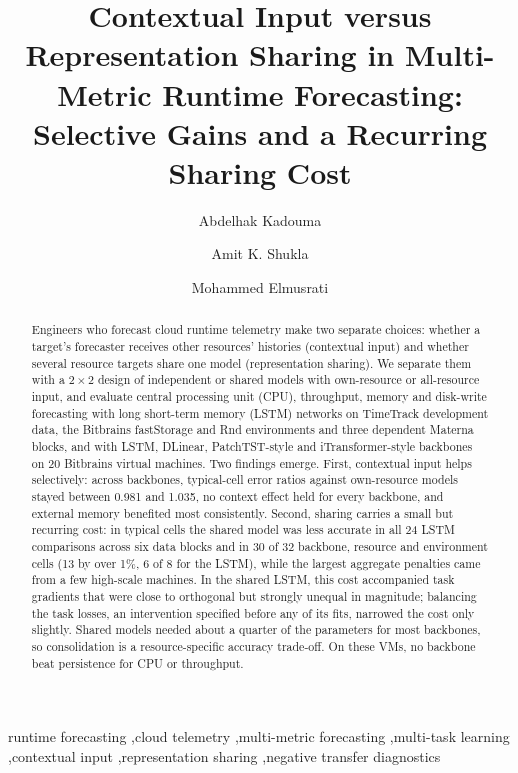 \documentclass[5p,twocolumn]{elsarticle}
\begin{document}
\begin{frontmatter}

\title{Contextual Input versus Representation Sharing in Multi-Metric Runtime Forecasting: Selective Gains and a Recurring Sharing Cost}

\author[uva]{Abdelhak Kadouma}
\author[uva,sau]{Amit K. Shukla}
\author[uva]{Mohammed Elmusrati}



\begin{abstract}
Engineers who forecast cloud runtime telemetry make two separate choices:
whether a target's forecaster receives other resources' histories (contextual
input) and whether several resource targets share one model (representation
sharing). We separate them with a $2\times2$ design of independent or shared
models with own-resource or all-resource input, and evaluate central
processing unit (CPU), throughput, memory and disk-write forecasting with long
short-term memory (LSTM) networks on TimeTrack development data, the
Bitbrains fastStorage and Rnd environments and three dependent Materna
blocks, and with LSTM, DLinear, PatchTST-style and iTransformer-style
backbones on 20 Bitbrains virtual machines. Two findings emerge. First,
contextual input helps selectively: across backbones, typical-cell error
ratios against own-resource models stayed between 0.981 and 1.035, no context
effect held for every backbone, and external memory benefited most
consistently. Second, sharing carries a small but recurring cost: in typical
cells the shared model was less accurate in all 24 LSTM comparisons across six data blocks
and in 30 of 32 backbone, resource and environment cells (13 by over 1\%,
6 of 8 for the LSTM), while the largest aggregate penalties came from a
few high-scale machines. In the shared LSTM,
this cost accompanied task gradients that were close to orthogonal but
strongly unequal in magnitude; balancing the task losses, an intervention
specified before any of its fits, narrowed the cost only slightly.
Shared models needed about a quarter of the parameters for most backbones,
so consolidation is a resource-specific accuracy trade-off. On these
VMs, no backbone beat persistence for CPU or throughput.
\end{abstract}

\begin{keyword}
runtime forecasting \sep cloud telemetry \sep multi-metric forecasting \sep multi-task learning \sep contextual input \sep representation sharing \sep negative transfer diagnostics
\end{keyword}

\end{frontmatter}
\end{document}
